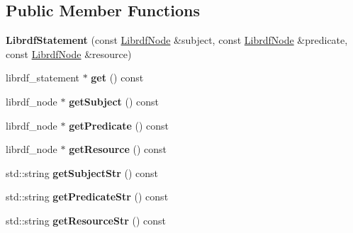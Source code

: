 \subsection*{Public Member Functions}
\begin{DoxyCompactItemize}
\item 
\mbox{\label{classredland_1_1LibrdfStatement_ae7f7e27b7a502070195103268407243a}} 
{\bfseries Librdf\+Statement} (const \hyperlink{classredland_1_1LibrdfNode}{Librdf\+Node} \&subject, const \hyperlink{classredland_1_1LibrdfNode}{Librdf\+Node} \&predicate, const \hyperlink{classredland_1_1LibrdfNode}{Librdf\+Node} \&resource)
\item 
\mbox{\label{classredland_1_1LibrdfStatement_a6b655a56f37dbe95fec840a0a1f0ed53}} 
librdf\+\_\+statement $\ast$ {\bfseries get} () const
\item 
\mbox{\label{classredland_1_1LibrdfStatement_abcf022b8e24a74282e1d059fdf54d3fe}} 
librdf\+\_\+node $\ast$ {\bfseries get\+Subject} () const
\item 
\mbox{\label{classredland_1_1LibrdfStatement_a5aae51ac0994552a13f2c9b90bec63d0}} 
librdf\+\_\+node $\ast$ {\bfseries get\+Predicate} () const
\item 
\mbox{\label{classredland_1_1LibrdfStatement_aa763688f20b712ddc655afe405d7691a}} 
librdf\+\_\+node $\ast$ {\bfseries get\+Resource} () const
\item 
\mbox{\label{classredland_1_1LibrdfStatement_a6feed51cdebe7c4f2430fcba0ae17f37}} 
std\+::string {\bfseries get\+Subject\+Str} () const
\item 
\mbox{\label{classredland_1_1LibrdfStatement_a5dd0d6a2e9fe1bfcf5254aa7928cdfaf}} 
std\+::string {\bfseries get\+Predicate\+Str} () const
\item 
\mbox{\label{classredland_1_1LibrdfStatement_adc21321df7ccf186c262e83a4438e993}} 
std\+::string {\bfseries get\+Resource\+Str} () const
\item 

\end{DoxyCompactItemize}
